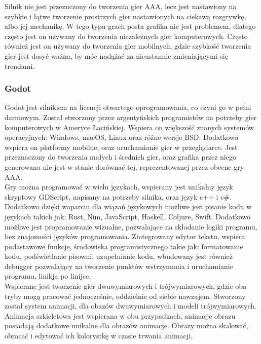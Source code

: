 \documentclass{article} %
\begin{document}
        Silnik nie jest przeznczony do tworzenia gier AAA, lecz jest nastawiony na szybkie i łątwe tworzenie prostrzych gier nastawionych na ciekawą rozgrywkę, albo jej mechanikę. W tego typu grach posta grafika nie jest problemem, dlatego często jest on używany do tworzenia niezależnych gier komputerowych. Często również jest on używany do tworzenia gier mobilnych, gdzie szybkość tworzenia gier jest dosyć ważna, by móc nadążać za nieustannie zmieniającymi się trendami.
        \\
        
        
        
        \subsubsection*{Godot}
        Godot jest silnikiem na licencji otwartego oprogramowania, co czyni go w pełni darmowym. Został stworzony przez argentyńskich programistów na potrzeby gier komputerowych w Ameryce Łacińskiej. Wspiera on większość znanych systemów operacyjnych: Windows, macOS, Linux oraz różne wersje BSD. Dodatkowo wspiera on platformy mobilne, oraz uruchamianie gier w przeglądarce. Jest przeznaczony do tworzenia małych i średnich gier, oraz grafika przez niego generowana nie jest w stanie dorównać tej, reprezentowanej przez obecne gry AAA.
        \\
        
        Gry można programować w wielu językach, wspierany jest unikalny język skryptowy GDScript, napisany na potrzeby silnika, oraz język c++ i c\#. Dodatkowo dzięki waparciu dla wiązań językowych możliwe jest pisanie kodu w językach takich jak: Rust, Nim, JavaScript, Haskell, Coljure, Swift. Dodatkowo możliwe jest propramowanie wizualne, pozwalające na składanie logiki programu, bez znajomości języków programowania. Zintegrowany edytor tekstu, wspiera podastawowe funkcje, środowiska programistycznego takie jak: formatowanie kodu, podświetlanie pisowni, uzupełnianie kodu, wbudowany jest również debugger pozwalający na tworzenie punktów wstrzymania i uruchamianie programu, linikja po linijce.
        \\
        
        Wspierane jest tworzenie gier dwuwymiarowych i trójwymiarowych, gdzie oba tryby mogą pracować jednocześnie, oddzielnie od siebie nawzajem. Stworzony został system animacji, dla obazów dwuwymiarowych i modeli trójwymiarowych. Animacja szkieletowa jest wspierana w obu przypadkach, animacje obrazu posiadają dodatkowe unikalne dla obrazów animacje. Obrazy można skalować, obracać i edytować ich kolorystkę w czasie trwania animacji. 
        \\
        
\end{document}
